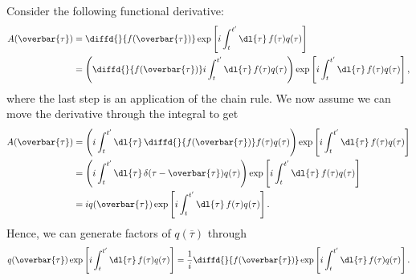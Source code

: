 \documentclass[fleqn]{NotesClass}
\begin{document}
    Consider the following functional derivative:
    \begin{align}
        A(\overbar{\tau}) &= \diffd{}{f(\overbar{\tau})} \exp\left[ i\int_t^{t'} \dl{\tau} \, f(\tau)q(\tau) \right]\\
        &= \left( \diffd{}{f(\overbar{\tau})} i\int_t^{t'} \dl{\tau} \, f(\tau) q(\tau) \right) \exp\left[ i\int_t^{t'} \dl{\tau} \, f(\tau) q(\tau) \right],
    \end{align}
    where the last step is an application of the chain rule.
    We now assume we can move the derivative through the integral to get
    \begin{align}
        A(\overbar{\tau}) &= \left( i\int_t^{t'} \dl{\tau} \, \diffd{}{f(\overbar{\tau})} f(\tau)q(\tau) \right) \exp\left[ i\int_t^{t'} \dl{\tau} \, f(\tau) q(\tau) \right]\\
        &= \left( i\int_t^{t'} \dl{\tau} \, \delta(\tau - \overbar{\tau}) q(\tau) \right) \exp\left[ i\int_t^{t'} \dl{\tau} \, f(\tau) q(\tau) \right]\\
        &= iq(\overbar{\tau}) \exp\left[ i\int_t^{t'} \dl{\tau} \, f(\tau) q(\tau) \right].
    \end{align}
    Hence, we can generate factors of \(q(\overbar{\tau})\) through
    \begin{equation}
        q(\overbar{\tau}) \exp\left[ i\int_t^{t'} \dl{\tau} \, f(\tau) q(\tau) \right] = \frac{1}{i}\diffd{}{f(\overbar{\tau})} \exp\left[ i\int_t^{t'} \dl{\tau} \, f(\tau) q(\tau) \right].
    \end{equation}
    
\end{document}

